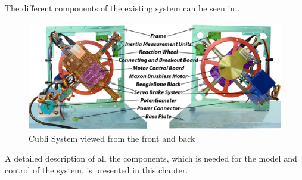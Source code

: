 The different components of the existing system can be seen in .
%
%
\begin{figure}[H]
	\centering
	\includegraphics[scale=0.24]{figures/Cubli11}
	\caption{Cubli System viewed from the front and back}
	\label{Cubli-11}
\end{figure}
%
A detailed description of all the components, which is needed for the model and control of the system, is presented in this chapter.

